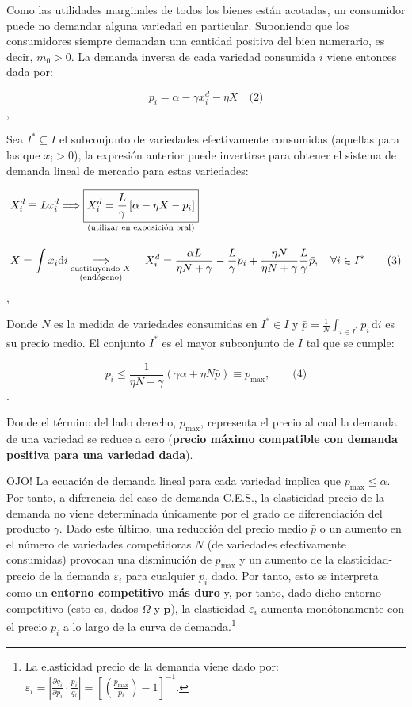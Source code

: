 \documentclass[10pt,a4paper]{article}
\begin{document}
Como las utilidades marginales de todos los bienes están acotadas, un consumidor puede no demandar alguna variedad en particular. Suponiendo que los consumidores siempre demandan una cantidad positiva del bien numerario, es decir, $m_0 > 0$. La demanda inversa de cada variedad consumida $i$ viene entonces dada por:

$$p_i = \alpha - \gamma x_i^d -\eta X\quad \text{(2)}$$,

Sea $I^* \subseteq I$ el subconjunto de variedades efectivamente consumidas (aquellas para las que $x_i > 0$), la expresión anterior puede invertirse para obtener el sistema de demanda lineal de mercado para estas variedades:

$$\begin{aligned}
    &X_i^d \equiv L x_i^d\Longrightarrow \underset{\text{\scriptsize (utilizar en exposición oral)}}{\boxed{X_i^d=\frac{L}{\gamma}\left[\alpha-\eta X-p_i\right]}}\\[1em]
    &X=\int x_i\mathrm di\underset{\substack{\text{\scriptsize sustituyendo $X$}\\\text{\scriptsize (endógeno)}}}{\Longrightarrow}\quad X_i^d=\frac{\alpha L}{\eta N + \gamma} - \frac{L}{\gamma} p_i + \frac{\eta N}{\eta N + \gamma} \frac{L}{\gamma} \bar{p}, \quad \forall i \in I^*\qquad \text{(3)}
\end{aligned}$$,

Donde $N$ es la medida de variedades consumidas en $I^*\in I$ y $\bar {p} = \frac{1}{N} \int_{i \in I^*} p_i \, \mathrm di$ es su precio medio. El conjunto $I^*$ es el mayor subconjunto de $I$ tal que se cumple:

$$p_i \leq \frac{1}{\eta N + \gamma} (\gamma \alpha + \eta N \bar{p}) \equiv p_{\max}, \qquad \text{(4)}$$.

Donde el término del lado derecho, $p_{\max}$, representa el precio al cual la demanda de una variedad se reduce a cero (\textbf{precio máximo compatible con demanda positiva para una variedad dada}). 

OJO! La ecuación de demanda lineal para cada variedad implica que $p_{\max} \leq \alpha$. Por tanto, a diferencia del caso de demanda C.E.S., la elasticidad-precio de la demanda no viene determinada únicamente por el grado de diferenciación del producto $\gamma$. Dado este último, una reducción del precio medio $\bar{p}$ o un aumento en el número de variedades competidoras $N$ (de variedades efectivamente consumidas) provocan una disminución de $p_{\max}$ y un aumento de la elasticidad-precio de la demanda $\varepsilon_i$ para cualquier $p_i$ dado. Por tanto, esto se interpreta como un \textbf{entorno competitivo más duro} y, por tanto, dado dicho entorno competitivo (esto es, dados $\Omega$ y $\mathbf{p}$), la elasticidad $\varepsilon_i$ aumenta monótonamente con el precio $p_i$ a lo largo de la curva de demanda.\footnote{%
    La elasticidad precio de la demanda viene dado por: $\varepsilon_i = \left| \frac{\partial q_i}{\partial p_i} \cdot \frac{p_i}{q_i} \right| = \left[\left(\frac{p_{\max}}{p_i}\right) - 1\right]^{-1}$.
} 
\end{document}
